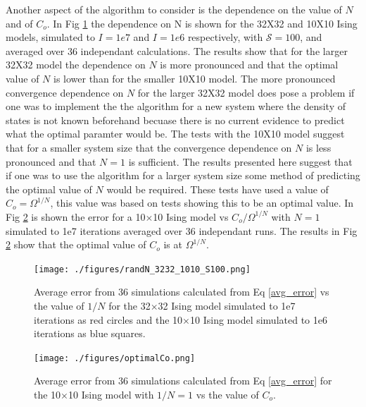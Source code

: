 \documentclass[aps,prl,reprint,superscriptaddress,showkeys]{revtex4-1}
\begin{document}
Another aspect of the algorithm to consider is the dependence on the value of $N$ and of $C_{o}$. In Fig \ref{N_dependence} the dependence on N is shown for  the 32X32  and  10X10 Ising models, simulated to $I=1e7$ and $I=1e6$ respectively, with $\mathcal{S}=100$, and averaged over 36 independant calculations. The results show that for the larger 32X32 model the dependence on $N$ is more pronounced and that the optimal value of $N$ is lower than for the smaller 10X10 model. The more pronounced convergence dependence on $N$ for the larger 32X32 model does pose a problem if one was to implement the the algorithm for a new system where the density of states is not known beforehand becuase there is no current evidence to predict what the optimal paramter would be.  The tests with the 10X10 model suggest that for a smaller system size that the convergence dependence on $N$ is less pronounced and that $N=1$ is sufficient. The results presented here suggest that if one was to use the algorithm for a larger system size some method of predicting the optimal value of $N$ would be required. These tests have used a value of $C_{o}=\Omega^{1/N}$, this value was based on tests showing this to be an optimal value. In Fig \ref{optimalCo}   is shown the error for a 10$\times$10 Ising model vs $C_{o}/\Omega^{1/N}$ with $N=1$ simulated to 1e7 iterations averaged over 36 independant runs. The results in Fig \ref{optimalCo}  show that the optimal value of $C_{o}$ is at $\Omega^{1/N}$. 

\begin{figure}[h!]
\texttt{[image: ./figures/randN\_3232\_1010\_S100.png]}\\
\caption{ Average error from 36 simulations calculated from Eq \ref{avg_error} vs the value of $1/N$ for the 32$\times$32 Ising model simulated to 1e7 iterations as red circles and the 10$\times$10 Ising model simulated to 1e6 iterations as blue squares.    \label{N_dependence}}
\end{figure}

\begin{figure}[h!]
\texttt{[image: ./figures/optimalCo.png]}
\caption{Average error from 36 simulations calculated from Eq \ref{avg_error} for the 10$\times$10 Ising model with $1/N=1$ vs the value of $C_{o}$.  \label{optimalCo}}
\end{figure}
\end{document}
